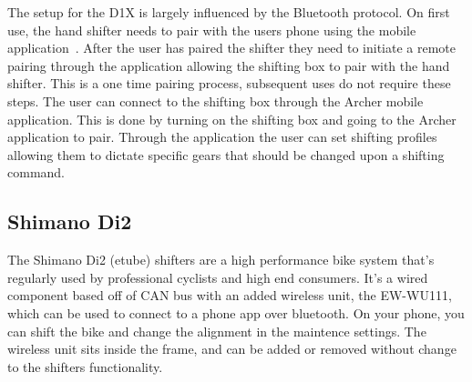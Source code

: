\documentclass[letterpaper,twocolumn,10pt]{article}
\begin{document}
The setup for the D1X is largely influenced by the Bluetooth protocol. On first use, the hand shifter needs to pair with the users phone using the mobile application~\cite{ArcherApp}. After the user has paired the shifter they need to initiate a remote pairing through the application allowing the shifting box to pair with the hand shifter. This is a one time pairing process, subsequent uses do not require these steps. The user can connect to the shifting box through the Archer mobile application. This is done by turning on the shifting box and going to the Archer application to pair. Through the application the user can set shifting profiles allowing them to dictate specific gears that should be changed upon a shifting command. 

\subsection{Shimano Di2}

The Shimano Di2 (etube) shifters are a high performance bike system that's regularly used by professional cyclists and high end consumers. It's a wired component based off of CAN bus with an added wireless unit, the EW-WU111, which can be used to connect to a phone app over bluetooth. On your phone, you can shift the bike and change the alignment in the maintence settings. The wireless unit sits inside the frame, and can be added or removed without change to the shifters functionality.
\end{document}
